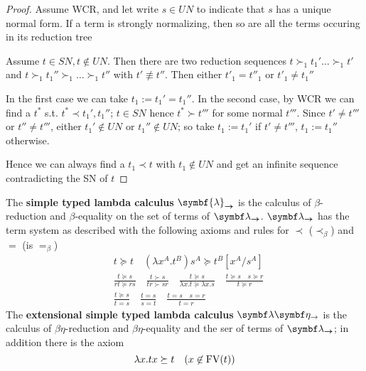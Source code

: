 \documentclass[11pt]{article}
\begin{document}
\begin{proof}
Assume WCR, and let write \(s\in UN\) to indicate that \(s\) has a unique normal
form. If a term is strongly normalizing, then so are all the terms occuring
in its reduction tree

Assume \(t\in SN, t\not\in UN\). Then there are two reduction sequences
\(t\succ_1 t_1'\dots\succ_1 t'\) and \(t\succ_1 t_1''\succ_1\dots\succ_1 t''\) with
\(t'\not\equiv t''\). Then either \(t'_1=t''_1\) or \(t'_1\neq t_1''\)

In the first case we can take \(t_1:=t_1'=t_1''\). In the second case, by WCR
we can find a \(t^*\) s.t. \(t^*\prec t_1',t_1''\); \(t\in SN\) hence \(t^*\succ
   t'''\) for some normal \(t'''\). Since \(t'\neq t'''\) or \(t''\neq t'''\), either
\(t_1'\not\in UN\) or \(t_1''\not\in UN\); so take \(t_1:=t_1'\) if \(t'\neq t'''\),
\(t_1:=t_1''\) otherwise.

Hence we can always find a \(t_1\prec t\) with \(t_1\not\in UN\) and get an
infinite sequence contradicting the SN of \(t\)
\end{proof}

\begin{definition}[]
The \textbf{simple typed lambda calculus} \(\symbf{ \lambda}_{\bto}\) is the calculus of
\(\beta\)-reduction and \(\beta\)-equality on the set of terms of \(\blambda_{\bto}\).
\(\blambda_{\bto}\) has the term system as described with the following axioms and
rules for \(\prec\) (\(\prec_\beta\)) and \(=\) (is \(=_\beta\))
\begin{align*}
&t\succeq t\quad(\lambda x^A.t^B)s^A\succeq t^B[x^A/s^A]\\
&\frac{t\succeq s}{rt\succeq rs}\quad
\frac{t\succ s}{tr\succ sr}\quad
\frac{t\succeq s}{\lambda x.t\succeq\lambda x.s}\quad
\frac{t\succeq s\quad s\succeq r}{t\succeq r}\\
&\frac{t\succeq s}{t=s}\quad\frac{t=s}{s=t}\quad
\frac{t=s\quad s=r}{t=r}
\end{align*}
The \textbf{extensional simple typed lambda calculus} \(\blambda\boldeta_\to\) is the
calculus of \(\beta \eta\)-reduction and \(\beta \eta\)-equality and the ser of terms
of \(\blambda_{\bto}\); in addition there is the axiom
\begin{equation*}
\lambda x.tx\succeq t\quad(x\not\in\text{FV}(t))
\end{equation*}
\end{definition}
\end{document}
